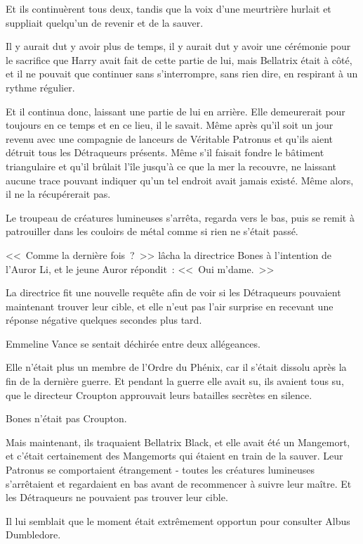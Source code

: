Et ils continuèrent tous deux, tandis que la voix d'une meurtrière hurlait et suppliait quelqu'un de revenir et de la sauver.

Il y aurait dut y avoir plus de temps, il y aurait dut y avoir une cérémonie pour le sacrifice que Harry avait fait de cette partie de lui, mais Bellatrix était à côté, et il ne pouvait que continuer sans s'interrompre, sans rien dire, en respirant à un rythme régulier.

Et il continua donc, laissant une partie de lui en arrière. Elle demeurerait pour toujours en ce temps et en ce lieu, il le savait. Même après qu'il soit un jour revenu avec une compagnie de lanceurs de Véritable Patronus et qu'ils aient détruit tous les Détraqueurs présents. Même s'il faisait fondre le bâtiment triangulaire et qu'il brûlait l'île jusqu'à ce que la mer la recouvre, ne laissant aucune trace pouvant indiquer qu'un tel endroit avait jamais existé. Même alors, il ne la récupérerait pas.

\later

Le troupeau de créatures lumineuses s'arrêta, regarda vers le bas, puis se remit à patrouiller dans les couloirs de métal comme si rien ne s'était passé.

<<~Comme la dernière fois~?~>> lâcha la directrice Bones à l'intention de l'Auror Li, et le jeune Auror répondit~: <<~Oui m'dame.~>>

La directrice fit une nouvelle requête afin de voir si les Détraqueurs pouvaient maintenant trouver leur cible, et elle n'eut pas l'air surprise en recevant une réponse négative quelques secondes plus tard.

Emmeline Vance se sentait déchirée entre deux allégeances.

Elle n'était plus un membre de l'Ordre du Phénix, car il s'était dissolu après la fin de la dernière guerre. Et pendant la guerre elle avait su, ils avaient tous su, que le directeur Croupton approuvait leurs batailles secrètes en silence.

Bones n'était pas Croupton.

Mais maintenant, ils traquaient Bellatrix Black, et elle avait été un Mangemort, et c'était certainement des Mangemorts qui étaient en train de la sauver. Leur Patronus se comportaient étrangement - toutes les créatures lumineuses s'arrêtaient et regardaient en bas avant de recommencer à suivre leur maître. Et les Détraqueurs ne pouvaient pas trouver leur cible.

Il lui semblait que le moment était extrêmement opportun pour consulter Albus Dumbledore.

